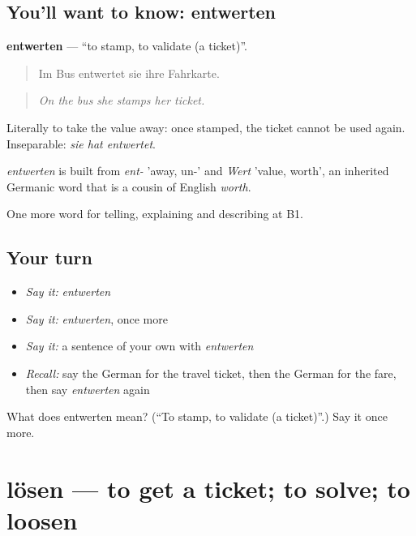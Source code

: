 \subsection*{You'll want to know: entwerten}
\textbf{entwerten} — \textquotedblleft{}to stamp, to validate (a ticket)\textquotedblright{}.

\begin{quote}
Im Bus entwertet sie ihre Fahrkarte.
\end{quote}

\begin{quote}
\emph{On the bus she stamps her ticket.}
\end{quote}

Literally to take the value away: once stamped, the ticket cannot be used again. Inseparable: \emph{sie hat entwertet}.

\begin{cousinweb}
\emph{entwerten} is built from \emph{ent-} 'away, un-' and \emph{Wert} 'value, worth', an inherited Germanic word that is a cousin of English \emph{worth}.
\end{cousinweb}

\begin{grammarlens}[title={What you've built}]
One more word for telling, explaining and describing at B1.
\end{grammarlens}

\subsection*{Your turn}
\begin{itemize}
\raggedright
  \item \emph{Say it:} \emph{entwerten}
  \item \emph{Say it:} \emph{entwerten}, once more
  \item \emph{Say it:} a sentence of your own with \emph{entwerten}
  \item \emph{Recall:} say the German for the travel ticket, then the German for the fare, then say \emph{entwerten} again
\end{itemize}

\begin{tcolorbox}[breakable,colback=teal!4,colframe=teal!35!black,title={Before you move on}]
What does entwerten mean? (\textquotedblleft{}To stamp, to validate (a ticket)\textquotedblright{}.) Say it once more.
\end{tcolorbox}
\section[lösen]{lösen — to get a ticket; to solve; to loosen}

